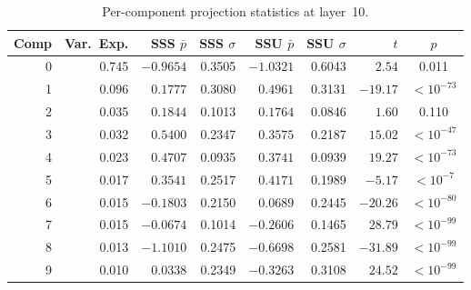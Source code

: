 \documentclass{article}
\begin{document}
\begin{table}[h]
\centering
\caption{Per-component projection statistics at layer~10.}
\label{tab:per_comp_l10}
\small
\begin{tabular}{r r rr rr r c}
\toprule
Comp & Var.\ Exp. & SSS $\bar{p}$ & SSS $\sigma$ & SSU $\bar{p}$ & SSU $\sigma$ & $t$ & $p$ \\
\midrule
0 & 0.745 & $-0.9654$ & 0.3505 & $-1.0321$ & 0.6043 &   $2.54$ & 0.011 \\
1 & 0.096 &  $0.1777$ & 0.3080 &  $0.4961$ & 0.3131 & $-19.17$ & $<10^{-73}$ \\
2 & 0.035 &  $0.1844$ & 0.1013 &  $0.1764$ & 0.0846 &   $1.60$ & 0.110 \\
3 & 0.032 &  $0.5400$ & 0.2347 &  $0.3575$ & 0.2187 &  $15.02$ & $<10^{-47}$ \\
4 & 0.023 &  $0.4707$ & 0.0935 &  $0.3741$ & 0.0939 &  $19.27$ & $<10^{-73}$ \\
5 & 0.017 &  $0.3541$ & 0.2517 &  $0.4171$ & 0.1989 &  $-5.17$ & $<10^{-7}$ \\
6 & 0.015 & $-0.1803$ & 0.2150 &  $0.0689$ & 0.2445 & $-20.26$ & $<10^{-80}$ \\
7 & 0.015 & $-0.0674$ & 0.1014 & $-0.2606$ & 0.1465 &  $28.79$ & $<10^{-99}$ \\
8 & 0.013 & $-1.1010$ & 0.2475 & $-0.6698$ & 0.2581 & $-31.89$ & $<10^{-99}$ \\
9 & 0.010 &  $0.0338$ & 0.2349 & $-0.3263$ & 0.3108 &  $24.52$ & $<10^{-99}$ \\
\bottomrule
\end{tabular}
\end{table}
\end{document}
